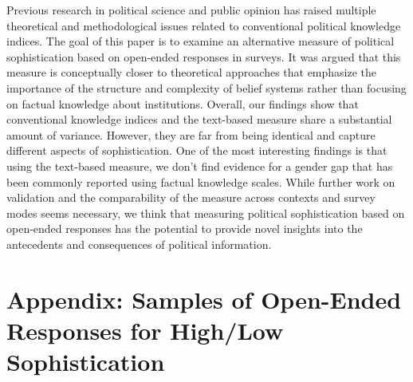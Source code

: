 \documentclass[12pt]{article}
\begin{document}
Previous research in political science and public opinion has raised multiple theoretical and methodological issues related to conventional political knowledge indices. The goal of this paper is to examine an alternative measure of political sophistication based on open-ended responses in surveys. It was argued that this measure is conceptually closer to theoretical approaches that emphasize the importance of the structure and complexity of belief systems rather than focusing on factual knowledge about institutions. Overall, our findings show that conventional knowledge indices and the text-based measure share a substantial amount of variance. However, they are far from being identical and capture different aspects of sophistication. One of the most interesting findings is that using the text-based measure, we don't find evidence for a gender gap that has been commonly reported using factual knowledge scales. While further work on validation and the comparability of the measure across contexts and survey modes seems necessary, we think that measuring political sophistication based on open-ended responses has the potential to provide novel insights into the antecedents and consequences of political information.

\clearpage\singlespacing\footnotesize



\clearpage
\section*{Appendix: Samples of Open-Ended Responses for High/Low Sophistication}
\end{document}
